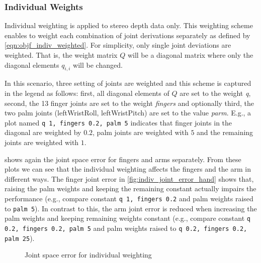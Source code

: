 \subsubsection{Individual Weights}

Individual weighting is applied to stereo depth data only. This weighting scheme enables to weight each combination of joint derivations separately as defined by \cref{eqn:objf_indiv_weighted}. For simplicity, only single joint deviations are weighted. That is, the weight matrix $Q$ will be a diagonal matrix where only the diagonal elements $q_{i,i}$ will be changed.

In this scenario, three setting of joints are weighted and this scheme is captured in the legend as follows: first, all diagonal elements of $Q$ are set to the weight \emph{q}, second, the 13 finger joints are set to the weight \emph{fingers} and optionally third, the two palm joints (leftWristRoll, leftWristPitch) are set to the value \emph{parm}. E.g., a plot named \texttt{q 1, fingers 0.2, palm 5} indicates that finger joints in the diagonal are weighted by $0.2$, palm joints are weighted with $5$ and the remaining joints are weighted with $1$.

 shows again the joint space error for fingers and arms separately. From these plots we can see that the individual weighting affects the fingers and the arm in different ways. The finger joint error in \cref{fig:indiv_joint_error_hand} shows that, raising the palm weights and keeping the remaining constant actually impairs the performance (e.g., compare constant \texttt{q 1, fingers 0.2} and palm weights raised to \texttt{palm 5}). In contrast to this, the arm joint error is reduced when increasing the palm weights and keeping remaining weights constant (e.g., compare constant \texttt{q 0.2, fingers 0.2, palm 5} and palm weights raised to \texttt{q 0.2, fingers 0.2, palm 25}).

\begin{figure}
\centering
{}
%

\caption{Joint space error for individual weighting}
\label{fig:indiv_joint_error}
\end{figure}

